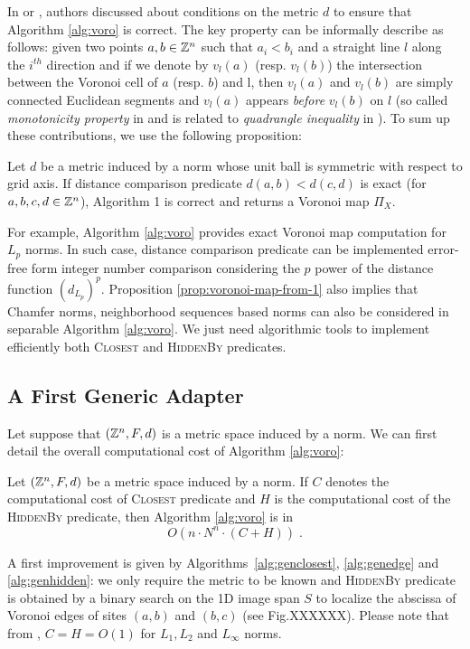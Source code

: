 \documentclass{llncs}
\begin{document}
In \cite{Hirata1996} or \cite{maurer_pami}, authors discussed about
conditions on the metric $d$ to ensure that Algorithm \ref{alg:voro}
is correct. The key property can be informally describe as follows:
given two points $a,b\in{\mathbb{Z}}^n$ such that $a_i<b_i$ and a straight line
$l$ along the $i^{th}$ direction and if we denote by $v_l(a)$
(resp. $v_l(b)$) the intersection between the Voronoi cell of $a$
(resp. $b$) and l, then $v_l(a)$ and $v_l(b)$ are simply connected
Euclidean segments and $v_l(a)$ appears \emph{before} $v_l(b)$ on $l$
(so called \emph{monotonicity property} in \cite{Maurer2003} and is
related to \emph{quadrangle inequality} in \cite{Hirata1996}).  To sum
up these contributions, we use the following proposition:
\begin{proposition}
\label{prop:voronoi-map-from-1}
  Let $d$ be a metric induced by a norm whose unit ball is symmetric
  with respect to grid axis. If distance comparison predicate
  $d(a,b)<d(c,d)$ is exact (for $a,b,c,d\in{\mathbb{Z}}^n$), Algorithm 1 is
  correct and returns a Voronoi map $\Pi_X$.
\end{proposition}

For example, Algorithm \ref{alg:voro} provides exact Voronoi map
computation for $L_p$ norms. In such case, distance comparison
predicate can be implemented error-free form integer number comparison
considering the $p$ power of the distance function $\left
(d_{L_p}\right)^p$.  Proposition \ref{prop:voronoi-map-from-1} also
implies that Chamfer norms, neighborhood sequences based norms can
also be considered in separable Algorithm \ref{alg:voro}. We just need
algorithmic tools to implement efficiently both \textsc{Closest} and
\textsc{HiddenBy} predicates.

\subsection{A First Generic Adapter}
\label{sec:first-gener-adapt}

Let suppose that $({\mathbb{Z}}^n,F,d)$ is a metric space induced by a norm. We
can first detail the overall computational cost of Algorithm
\ref{alg:voro}:
\begin{lemma}
\label{lem:generic}
   Let $({\mathbb{Z}}^n, F, d)$ be a metric space induced by a norm. If $C$
  denotes the computational cost of \textsc{Closest} predicate and $H$
  is the computational cost of the \textsc{HiddenBy} predicate, then
  Algorithm \ref{alg:voro} is in
  \begin{equation}
    O(n\cdot N^n\cdot (C+H))\;.
  \end{equation}
\end{lemma}
A first improvement is given by Algorithms~\ref{alg:genclosest},
\ref{alg:genedge} and \ref{alg:genhidden}: we only require the metric
to be known and \textsc{HiddenBy} predicate is obtained by a binary
search on the 1D image span $S$ to localize the abscissa of Voronoi
edges of sites $(a,b)$ and $(b,c)$ (see Fig.XXXXXX). Please note that
from \cite{Breu1995,roerdnik}, $C=H=O(1)$ for $L_1,L_2$ and $L_\infty$
norms.
\end{document}
